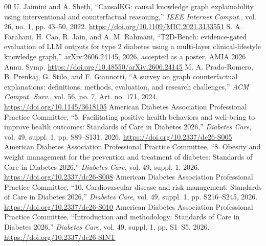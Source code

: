 \documentclass[conference]{IEEEtran}
\begin{document}
\begin{thebibliography}{00}
 U. Jaimini and A. Sheth, ``CausalKG: causal knowledge graph explainability using interventional and counterfactual reasoning,'' \emph{IEEE Internet Comput.}, vol. 26, no. 1, pp. 43--50, 2022. \url{https://doi.org/10.1109/MIC.2021.3133551}
 S. A. Farahani, H. Cao, R. Jain, and A. M. Rahmani, ``T2D-Bench: evidence-gated evaluation of LLM outputs for type 2 diabetes using a multi-layer clinical-lifestyle knowledge graph,'' arXiv:2606.24145, 2026, accepted as a poster, AMIA 2026 Annu. Symp. \url{https://doi.org/10.48550/arXiv.2606.24145}
 M. A. Prado-Romero, B. Prenkaj, G. Stilo, and F. Giannotti, ``A survey on graph counterfactual explanations: definitions, methods, evaluation, and research challenges,'' \emph{ACM Comput. Surv.}, vol. 56, no. 7, Art. no. 171, 2024. \url{https://doi.org/10.1145/3618105}
 American Diabetes Association Professional Practice Committee, ``5. Facilitating positive health behaviors and well-being to improve health outcomes: Standards of Care in Diabetes 2026,'' \emph{Diabetes Care}, vol. 49, suppl. 1, pp. S89--S131, 2026. \url{https://doi.org/10.2337/dc26-S005}
 American Diabetes Association Professional Practice Committee, ``8. Obesity and weight management for the prevention and treatment of diabetes: Standards of Care in Diabetes 2026,'' \emph{Diabetes Care}, vol. 49, suppl. 1, 2026. \url{https://doi.org/10.2337/dc26-S008}
 American Diabetes Association Professional Practice Committee, ``10. Cardiovascular disease and risk management: Standards of Care in Diabetes 2026,'' \emph{Diabetes Care}, vol. 49, suppl. 1, pp. S216--S245, 2026. \url{https://doi.org/10.2337/dc26-S010}
 American Diabetes Association Professional Practice Committee, ``Introduction and methodology: Standards of Care in Diabetes 2026,'' \emph{Diabetes Care}, vol. 49, suppl. 1, pp. S1--S5, 2026. \url{https://doi.org/10.2337/dc26-SINT}
\end{thebibliography}
\end{document}
